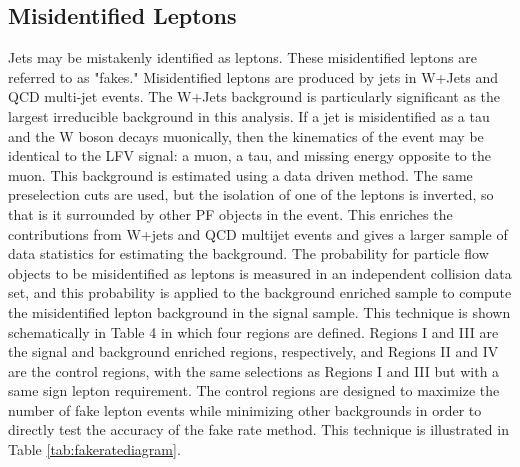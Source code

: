 \documentclass[oneside, letterpaper, oldfontcommands]{memoir}
\begin{document}
\subsection{Misidentified Leptons}\label{fakes}
\qquad Jets may be mistakenly identified as leptons. These misidentified leptons are referred to as "fakes." Misidentified leptons are produced by jets in W+Jets and QCD multi-jet events. The W+Jets background is particularly significant as the largest irreducible background in this analysis. If a jet is misidentified as a tau and the W boson decays muonically, then the kinematics of the event may be identical to the LFV signal: a muon, a tau, and missing energy opposite to the muon. This background is estimated using a data driven method. The same preselection cuts are used, but the isolation of one of the leptons is inverted, so that is it surrounded by other PF objects in the event. This enriches the contributions from W+jets and QCD multijet events and gives a larger sample of data statistics for estimating the background. The probability for particle flow objects to be misidentified as leptons is measured in an independent collision data set, and this probability is applied to the background enriched sample to compute the misidentified lepton background in the signal sample. This technique is shown schematically in Table 4 in which four regions are defined. Regions I and III are the signal and background enriched regions, respectively, and Regions II and IV are the control regions, with the same selections as Regions I and III but with a same sign lepton requirement. The control regions are designed to maximize the number of fake lepton events while minimizing other backgrounds in order to directly test the accuracy of the fake rate method. This technique is illustrated in Table \ref{tab:fakeratediagram}.
\end{document}
